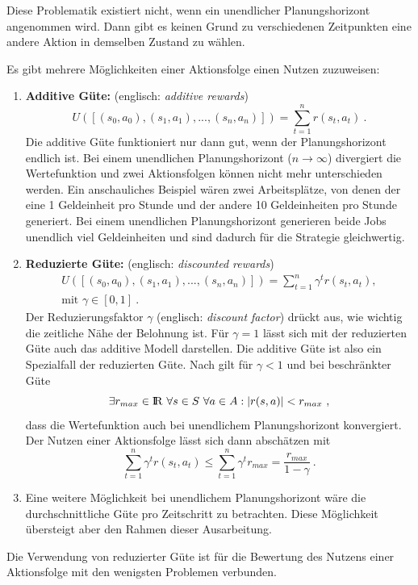 \documentclass[a4paper]{IEEEtran}
\def\IR{\mathrm{I\hspace{-2pt}R}} %
\begin{document}
Diese Problematik existiert nicht, wenn ein unendlicher Planungshorizont angenommen wird. Dann gibt es keinen Grund zu verschiedenen Zeitpunkten eine andere Aktion in demselben Zustand zu wählen.

Es gibt mehrere Möglichkeiten einer Aktionsfolge einen Nutzen zuzuweisen:
\begin{enumerate}
	\item \textbf{Additive Güte:} (englisch: \emph{additive rewards})
		\begin{equation}
			U([ (s_0, a_0), (s_1, a_1), ..., (s_n, a_n)]) = \sum\limits_{t=1}^n r(s_t, a_t)\ .
		\end{equation}
		Die additive Güte funktioniert nur dann gut, wenn der Planungshorizont endlich ist. Bei einem unendlichen Planungshorizont ($n \rightarrow \infty$) divergiert die Wertefunktion und zwei Aktionsfolgen können nicht mehr unterschieden werden. Ein anschauliches Beispiel wären zwei Arbeitsplätze, von denen der eine 1 Geldeinheit pro Stunde und der andere 10 Geldeinheiten pro Stunde generiert. Bei einem unendlichen Planungshorizont generieren beide Jobs unendlich viel Geldeinheiten und sind dadurch für die Strategie gleichwertig.
	\item \textbf{Reduzierte Güte:} (englisch: \emph{discounted rewards})
		\begin{equation}
			\begin{split}
				U([ (s_0, a_0), (s_1, a_1), ..., (s_n, a_n)]) = \sum\limits_{t=1}^n \gamma^t r(s_t, a_t),\\
				\text{mit }\gamma \in [0,1]\ .
			\end{split}
		\end{equation}
		Der Reduzierungsfaktor $\gamma$ (englisch: \emph{discount factor}) drückt aus, wie wichtig die zeitliche Nähe der Belohnung ist. Für $\gamma=1$ lässt sich mit der reduzierten Güte auch das additive Modell darstellen. Die additive Güte ist also ein Spezialfall der reduzierten Güte. Nach \cite{thrun2005probabilistic} gilt für $\gamma < 1$ und bei beschränkter Güte 
		\begin{equation}
			\exists r_{max} \in \IR\ \forall s \in S\ \forall a \in A: |r(s,a)| < r_{max} \ ,
		\end{equation}
		dass die Wertefunktion auch bei unendlichem Planungshorizont konvergiert. Der Nutzen einer Aktionsfolge lässt sich dann abschätzen mit  
		\begin{equation}
			\sum\limits_{t=1}^n \gamma^t r(s_t, a_t) \leq \sum\limits_{t=1}^n \gamma^t r_{max} = \frac{r_{max}}{1-\gamma}  \ .
		\end{equation}
	\item
		Eine weitere Möglichkeit bei unendlichem Planungshorizont wäre die durchschnittliche Güte pro Zeitschritt zu betrachten. Diese Möglichkeit übersteigt aber den Rahmen dieser Ausarbeitung.
\end{enumerate}
Die Verwendung von reduzierter Güte ist für die Bewertung des Nutzens einer Aktionsfolge mit den wenigsten Problemen verbunden.
\end{document}
